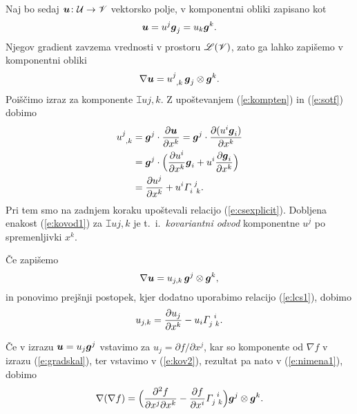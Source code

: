 Naj bo sedaj $\boldsymbol u\colon \mathcal U\to\mathscr V$ vektorsko polje, v komponentni obliki
zapisano kot
\[ \boldsymbol u=u^j\boldsymbol g_j=u_k\boldsymbol g^k. \]
Njegov gradient zavzema vrednosti v prostoru $\mathscr L(\mathscr V)$, zato ga lahko zapišemo v komponentni obliki
\begin{equation} \label{e:gradukomp}
	\nabla\vek{u}=\topbot{u}{j}{,k}\,\vek{g}_j\otimes\vek{g}^k.
\end{equation}
Poiščimo izraz za komponente $\topbot{u}{j}{,k}$. Z upoštevanjem
(\ref{e:kompten}) in (\ref{e:sotf}) dobimo
\begin{align}
	\topbot{u}{j}{,k}&=\vek{g}^j\cdot\frac{\partial\vek{u}}{\partial x^k}=
	\vek{g}^j\cdot\frac{\partial(u^i\vek{g}_i)}{\partial x^k} \nonumber \\
	&=\vek{g}^j\cdot\Big(\frac{\partial u^i}{\partial x^k}\vek{g}_i+
	u^i\frac{\partial\vek{g}_i}{\partial x^k}\Big) \nonumber \\
	&=\frac{\partial u^j}{\partial x^k}+u^i\cs{i}{j}{k}. \label{e:kovod1}
\end{align}
Pri tem smo na zadnjem koraku upoštevali relacijo (\ref{e:csexplicit}). Dobljena enakost (\ref{e:kovod1})
za $\topbot{u}{j}{,k}$ je t.~i.~\emph{kovariantni odvod} komponentne $u^j$ po spremenljivki $x^k$.

Če zapišemo
\begin{equation} \label{e:nimena1}
	\nabla\boldsymbol u=u_{j,k}\,\boldsymbol g^j\otimes\boldsymbol g^k,
\end{equation}
in ponovimo prejšnji postopek, kjer dodatno uporabimo relacijo (\ref{e:lcs1}), dobimo
\begin{equation} \label{e:kov2}
	u_{j,k}=\frac{\partial u_j}{\partial x^k}-u_i\cs{j}{i}{k}.
\end{equation}
\begin{primer}
	Če v izrazu $\boldsymbol u=u_j\boldsymbol g^j$ vstavimo za $u_j=\partial f/\partial x^j$,
	kar so komponente od $\nabla f$ v izrazu (\ref{e:gradskal}), ter vstavimo v
	(\ref{e:kov2}), rezultat pa nato v (\ref{e:nimena1}), dobimo
	\begin{equation} \label{e:dvagrad}
		\nabla(\nabla f)=\Big(\frac{\partial^2 f}{\partial x^j\partial x^k}-
		\frac{\partial f}{\partial x^i}\cs{j}{i}{k}\Big)\vek{g}^j\otimes\vek{g}^k.
	\end{equation}
\end{primer}

